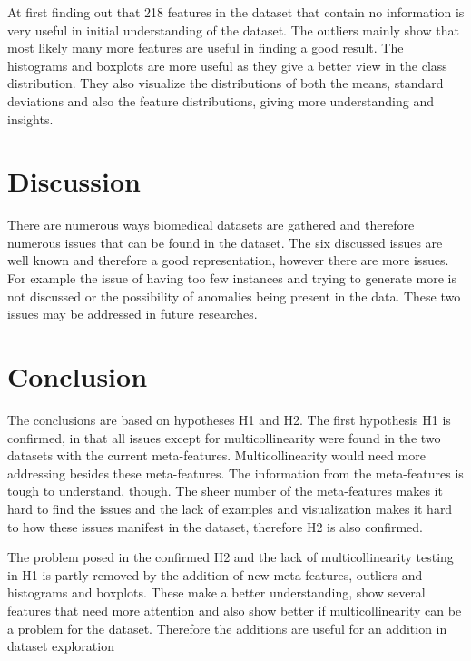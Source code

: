\documentclass[10pt,a4paper]{article}
\begin{document}
	At first finding out that 218 features in the dataset that contain no information is very useful in initial understanding of the dataset. The outliers mainly show that most likely many more features are useful in finding a good result. The histograms and boxplots are more useful as they give a better view in the class distribution. They also visualize the distributions of both the means, standard deviations and also the feature distributions, giving more understanding and insights.
	
	\section{Discussion}
	\label{sec:Discussion}
	
	There are numerous ways biomedical datasets are gathered and therefore numerous issues that can be found in the dataset. The six discussed issues are well known and therefore a good representation, however there are more issues. For example the issue of having too few instances and trying to generate more is not discussed or the possibility of anomalies being present in the data. These two issues may be addressed in future researches.
	
		
	\section{Conclusion}
	\label{sec:Conclusions}
	
	The conclusions are based on hypotheses H1 and H2. The first hypothesis H1 is confirmed, in that all issues except for multicollinearity were found in the two datasets with the current meta-features. Multicollinearity would need more addressing besides these meta-features. The information from the meta-features is tough to understand, though. The sheer number of the meta-features makes it hard to find the issues and the lack of examples and visualization makes it hard to how these issues manifest in the dataset, therefore H2 is also confirmed.
	
	The problem posed in the confirmed H2 and the lack of multicollinearity testing in H1 is partly removed by the addition of new meta-features, outliers and histograms and boxplots. These make a better understanding, show several features that need more attention and also show better if multicollinearity can be a problem for the dataset. Therefore the additions are useful for an addition in dataset exploration
	
\end{document}
